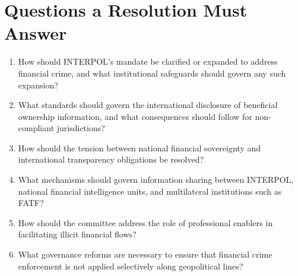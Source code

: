 \section{Questions a Resolution Must Answer}

\begin{enumerate}
  \item How should INTERPOL's mandate be clarified or expanded to address financial crime, and what institutional safeguards should govern any such expansion?
  \item What standards should govern the international disclosure of beneficial ownership information, and what consequences should follow for non-compliant jurisdictions?
  \item How should the tension between national financial sovereignty and international transparency obligations be resolved?
  \item What mechanisms should govern information sharing between INTERPOL, national financial intelligence units, and multilateral institutions such as FATF?
  \item How should the committee address the role of professional enablers in facilitating illicit financial flows?
  \item What governance reforms are necessary to ensure that financial crime enforcement is not applied selectively along geopolitical lines?
\end{enumerate}

